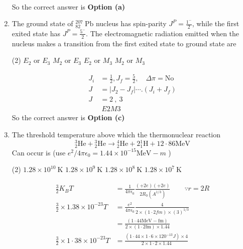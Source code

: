\begin{enumerate}
\begin{answer}
$$\begin{aligned}
\end{aligned}
$$
	So the correct answer is \textbf{Option (a)}
\end{answer}
	\item The ground state of ${ }_{82}^{207} \mathrm{~Pb}$ nucleus has spin-parity $J^P=\frac{1^{-}}{2}$, while the first exited state has $J^P=\frac{5^{-}}{2}$. The electromagnetic radiation emitted when the nucleus makes a transition from the first exited state to ground state are
 \begin{tasks}(2)
	\task[\textbf{a.}]$E_2$ or $E_3$
	\task[\textbf{b.}] $M_2$ or $E_3$
	\task[\textbf{c.}]$E_2$ or $M_3$
	\task[\textbf{d.}] $M_2$ or $M_3$	
\end{tasks}
\begin{answer}
	$$
	\begin{aligned}
	J_i&=\frac{1}{2}, J_f=\frac{5}{2}, \quad \Delta \pi=\mathrm{No}\\
	J&=\left|J_2-J_f\right| \cdots .\left(J_i+J_f\right) \\
	J&=2\ ,\ 3\\
&	\ E 2 M 3
\end{aligned}
$$
	So the correct answer is \textbf{Option (c)}
\end{answer}
	\item The threshold temperature above which the thermonuclear reaction
$$
{ }_2^3 \mathrm{He}+{ }_2^3 \mathrm{He} \rightarrow{ }_2^4 \mathrm{He}+2{ }_1^1 \mathrm{H}+12 \cdot 86 \mathrm{MeV}
$$
Can occur is (use $e^2 / 4 \pi \epsilon_0=1.44 \times 10^{-15} \mathrm{MeV}-m$ )
 \begin{tasks}(2)
	\task[\textbf{a.}]$1.28 \times 10^{10} \mathrm{~K}$
	\task[\textbf{b.}]$1.28 \times 10^9 \mathrm{~K}$
	\task[\textbf{c.}] $1.28 \times 10^8 \mathrm{~K}$
	\task[\textbf{d.}] $1.28 \times 10^7 \mathrm{~K}$
\end{tasks}
\begin{answer}
	$$
	\begin{aligned}
	\frac{3}{2} K_B T&=\frac{1}{4 \pi \epsilon_0} \frac{(+2 e)(+2 e)}{2 R_0\left(A^{1 / 3}\right)} \qquad \because r=2 R\\
	\frac{3}{2} \times 1.38 \times 10^{-23} T &=\frac{e^2}{4 \pi \epsilon_0} \frac{4}{2 \times(1 \cdot 2 f m) \times(3)^{1 / 3}} \\
	&= \frac{(1 \cdot 44 \mathrm{MeV}-\mathrm{fm})}{2 \times(1 \cdot 2 \mathrm{fm}) \times 1.44}\\
	\frac{3}{2} \times 1 \cdot 38 \times 10^{-23} T &=\frac{\left(1 \cdot 44 \times 1 \cdot 6 \times 120^{-13} J\right) \times 4}{2 \times 1 \cdot 2 \times 1.44} \\

\end{aligned}$$
\end{answer}
\end{enumerate}
